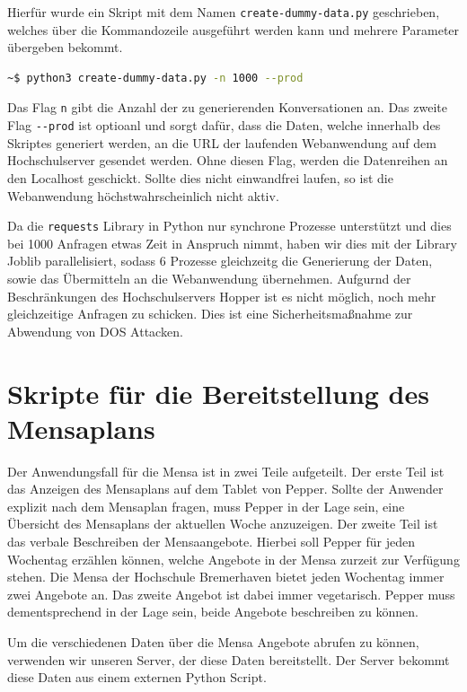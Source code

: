 Hierfür wurde ein Skript mit dem Namen \verb|create-dummy-data.py| geschrieben, welches über die Kommandozeile ausgeführt werden kann und mehrere Parameter übergeben bekommt.\\

\begin{lstlisting}[language=Bash]
    ~$ python3 create-dummy-data.py -n 1000 --prod
\end{lstlisting}

Das Flag \verb|n| gibt die Anzahl der zu generierenden Konversationen an. Das zweite Flag \verb|--prod| ist optioanl und sorgt dafür, dass die Daten, welche innerhalb des Skriptes generiert werden, an die URL der laufenden Webanwendung auf dem Hochschulserver gesendet werden. Ohne diesen Flag, werden die Datenreihen an den Localhost geschickt. Sollte dies nicht einwandfrei laufen, so ist die Webanwendung höchstwahrscheinlich nicht aktiv.

Da die \verb|requests| Library in Python nur synchrone Prozesse unterstützt und dies bei 1000 Anfragen etwas Zeit in Anspruch nimmt, haben wir dies mit der Library Joblib parallelisiert, sodass 6 Prozesse gleichzeitg die Generierung der Daten, sowie das Übermitteln an die Webanwendung übernehmen. Aufgurnd der Beschränkungen des Hochschulservers Hopper ist es nicht möglich, noch mehr gleichzeitige Anfragen zu schicken. Dies ist eine Sicherheitsmaßnahme zur Abwendung von DOS Attacken.\\


\section{Skripte für die Bereitstellung des Mensaplans}

Der Anwendungsfall für die Mensa ist in zwei Teile aufgeteilt. Der erste Teil ist das Anzeigen des Mensaplans auf dem Tablet von Pepper. Sollte der Anwender explizit nach dem Mensaplan fragen, muss Pepper in der Lage sein, eine Übersicht des Mensaplans der aktuellen Woche anzuzeigen. 
Der zweite Teil ist das verbale Beschreiben der Mensaangebote. Hierbei soll Pepper für jeden Wochentag erzählen können, welche Angebote in der Mensa zurzeit zur Verfügung stehen. Die Mensa der Hochschule Bremerhaven bietet jeden Wochentag immer zwei Angebote an. Das zweite Angebot ist dabei immer vegetarisch. Pepper muss dementsprechend in der Lage sein, beide Angebote beschreiben zu können. 

Um die verschiedenen Daten über die Mensa Angebote abrufen zu können, verwenden wir unseren Server, der diese Daten bereitstellt. Der Server bekommt diese Daten aus einem externen Python Script.\\

